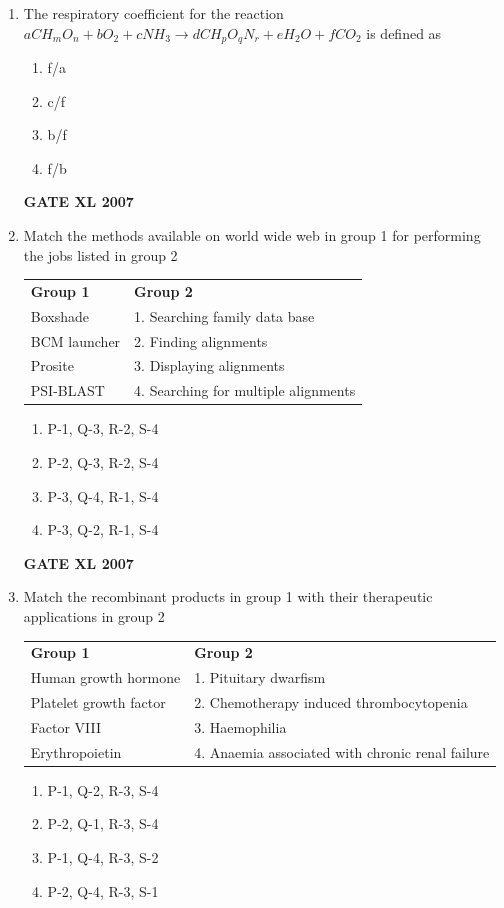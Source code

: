 \documentclass[journal,12pt,onecolumn]{IEEEtran}
\begin{document}
\begin{enumerate}
    \item The respiratory coefficient for the reaction $a CH_mO_n + b O_2 + c NH_3 \rightarrow d C H_p O_q N_r + e H_2O + f CO_2$ is defined as
	    \begin{enumerate}
	\item f/a
        \item c/f
        \item b/f
        \item f/b
    \end{enumerate}
	    \hfill \textbf{GATE XL 2007}

    \item Match the methods available on world wide web in group 1 for performing the jobs listed in group 2
    \begin{tabularx}{\textwidth}{@{}lX@{}}
	    \textbf{Group 1} & \textbf{Group 2}\\
     Boxshade & 1. Searching family data base\\
     BCM launcher & 2. Finding alignments\\
     Prosite & 3. Displaying alignments\\
     PSI-BLAST & 4. Searching for multiple alignments\\
    \end{tabularx}
    \begin{enumerate}
        \item P-1, Q-3, R-2, S-4
        \item P-2, Q-3, R-2, S-4
        \item P-3, Q-4, R-1, S-4
        \item P-3, Q-2, R-1, S-4
    \end{enumerate}
	    \hfill \textbf{GATE XL 2007}

    \item Match the recombinant products in group 1 with their therapeutic applications in group 2

    \begin{tabularx}{\textwidth}{@{}lX@{}}
	    \textbf{Group 1} & \textbf{Group 2}\\
	     Human growth hormone & 1. Pituitary dwarfism\\
	     Platelet growth factor & 2. Chemotherapy induced thrombocytopenia\\
	     Factor VIII & 3. Haemophilia\\
    	 Erythropoietin & 4. Anaemia associated with chronic renal failure\\
    \end{tabularx}
    \begin{enumerate}
        \item P-1, Q-2, R-3, S-4
        \item P-2, Q-1, R-3, S-4
        \item P-1, Q-4, R-3, S-2
        \item P-2, Q-4, R-3, S-1
    \end{enumerate}


\end{enumerate}
\end{document}
